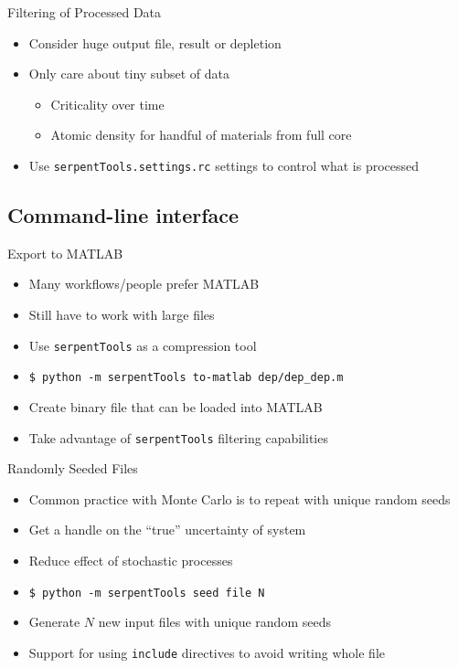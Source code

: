 \documentclass{beamer}
\newcommand{\st}{\texttt{serpentTools} }
\begin{document}
\begin{frame}{Filtering of Processed Data}
    \begin{itemize}
        \item Consider huge output file, result or depletion
        \item Only care about tiny subset of data
        \begin{itemize}
            \item Criticality over time
            \item Atomic density for handful of materials from full core
        \end{itemize}
    \item Use \texttt{serpentTools.settings.rc} settings to control what is processed
    \end{itemize}
\end{frame}

\subsection{Command-line interface}

\begin{frame}{Export to MATLAB}
    \begin{itemize}
        \item Many workflows/people prefer MATLAB
        \item Still have to work with large files
        \item Use \st as a compression tool
        \item \texttt{\$ python -m serpentTools to-matlab dep/dep\_dep.m}
        \item Create binary file that can be loaded into MATLAB
        \item Take advantage of \st filtering capabilities
    \end{itemize}
\end{frame}

\begin{frame}{Randomly Seeded Files}
    \begin{itemize}
        \item Common practice with Monte Carlo is to repeat with unique random seeds
        \item Get a handle on the ``true'' uncertainty of system
        \item Reduce effect of stochastic processes
        \item \texttt{\$ python -m serpentTools seed file N}
        \item Generate $N$ new input files with unique random seeds
        \item Support for using \texttt{include} directives to avoid writing whole file
    \end{itemize}
\end{frame}
\end{document}
